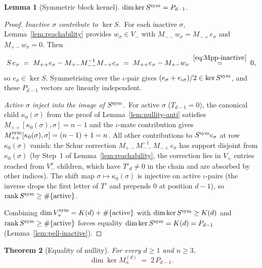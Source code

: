 \documentclass{amsart}
\newtheorem{theorem}{Theorem}[section]
\newtheorem{lemma}[theorem]{Lemma}
\theoremstyle{definition}
\theoremstyle{remark}
\DeclareMathOperator{\rank}{rank}
\begin{document}
\begin{lemma}[Symmetric block kernel]
\label{lem:nullity-sym}
$\dim \ker S^{\rm sym} = P_{d-1}$.
\end{lemma}

\begin{proof}
\textit{Inactive $\sigma$ contribute to $\ker S$.}\
For each inactive $\sigma$, Lemma~\ref{lem:reachability}
provides $w_\sigma \in V_-$ with $M_{--} w_\sigma = M_{-+} e_\sigma$
and $M_{+-} w_\sigma = 0$.  Then
\[
  S\,e_\sigma
  \;=\; M_{++} e_\sigma - M_{+-} M_{--}^{-1} M_{-+} e_\sigma
  \;=\; M_{++} e_\sigma - M_{+-} w_\sigma
  \;\stackrel{\eqref{eq:Mpp-inactive}}{=}\; 0,
\]
so $e_\sigma \in \ker S$.  Symmetrising over the $\iota$-pair gives
$(e_\sigma + e_{\iota\sigma})/2 \in \ker S^{\rm sym}$, and these
$P_{d-1}$ vectors are linearly independent.

\textit{Active $\sigma$ inject into the image of $S^{\rm sym}$.}\
For active $\sigma$ ($T_{d-1} = 0$), the canonical child
$\kappa_0(\sigma)$ from the proof of Lemma~\ref{lem:nullity-anti}
satisfies $M_{++}[\kappa_0(\sigma), \sigma] = n - 1$ and the
$\iota$-mate contribution gives $M_{++}^{\rm sym}[\kappa_0(\sigma), \sigma]
= (n - 1) + 1 = n$.  All other contributions to $S^{\rm sym}
e_\sigma$ at row $\kappa_0(\sigma)$ vanish: the Schur correction
$M_{+-} M_{--}^{-1} M_{-+} e_\sigma$ has support disjoint from
$\kappa_0(\sigma)$ (by Step~1 of Lemma~\ref{lem:reachability}, the
correction lies in $V_+$ entries reached from $V_-^a$ children,
which have $T'_d \neq 0$ in the chain and are absorbed by other
indices).  The shift map $\sigma \mapsto \kappa_0(\sigma)$ is
injective on active $\iota$-pairs (the inverse drops the first letter
of $T'$ and prepends $0$ at position $d-1$), so
$\rank S^{\rm sym} \ge \#\{\text{active}\}$.

Combining $\dim V_+^{\rm sym} = K(d) + \#\{\text{active}\}$
with $\dim \ker S^{\rm sym} \ge K(d)$ and $\rank S^{\rm sym}
\ge \#\{\text{active}\}$ forces equality
$\dim \ker S^{\rm sym} = K(d) = P_{d-1}$ (Lemma~\ref{lem:pell-inactive}).
\end{proof}

\begin{theorem}[Equality of nullity]
\label{thm:nullity-equal}
For every $d \ge 1$ and $n \ge 3$,
\begin{equation}\label{eq:nullity-equal-final}
  \dim \ker M_n^{(d)} \;=\; 2\,P_{d-1}.
\end{equation}
\end{theorem}
\end{document}

